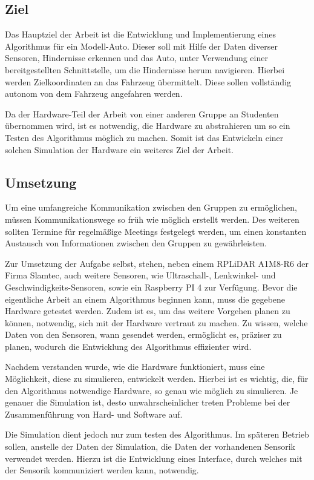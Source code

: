\subsection{Ziel}
Das Hauptziel der Arbeit ist die Entwicklung und Implementierung eines Algorithmus für ein Modell-Auto. Dieser soll mit Hilfe der Daten diverser Sensoren, Hindernisse
erkennen und das Auto, unter Verwendung einer bereitgestellten Schnittstelle, um die Hindernisse herum navigieren.
Hierbei werden Zielkoordinaten an das Fahrzeug übermittelt.
Diese sollen vollständig autonom von dem Fahrzeug angefahren werden.

Da der Hardware-Teil der Arbeit von einer anderen Gruppe an Studenten übernommen wird, ist es notwendig, die Hardware zu abstrahieren um so ein Testen des Algorithmus möglich zu machen. 
Somit ist das Entwickeln einer solchen Simulation der Hardware ein weiteres Ziel der Arbeit.

\subsection{Umsetzung}
Um eine umfangreiche Kommunikation zwischen den Gruppen zu ermöglichen, müssen Kommunikationswege so früh wie möglich erstellt werden.
Des weiteren sollten Termine für regelmäßige Meetings festgelegt werden, um einen konstanten Austausch von Informationen zwischen den Gruppen zu gewährleisten.

Zur Umsetzung der Aufgabe selbst, stehen, neben einem RPLiDAR A1M8-R6 der Firma Slamtec, auch weitere Sensoren, 
wie Ultraschall-, Lenkwinkel- und Geschwindigkeits-Sensoren, sowie ein Raspberry PI 4 zur Verfügung.
Bevor die eigentliche Arbeit an einem Algorithmus beginnen kann, muss die gegebene Hardware getestet werden. 
Zudem ist es, um das weitere Vorgehen planen zu können, notwendig, sich mit der Hardware vertraut zu machen. 
Zu wissen, welche Daten von den Sensoren, wann gesendet werden, ermöglicht es, präziser zu planen, wodurch die Entwicklung des Algorithmus effizienter wird.

Nachdem verstanden wurde, wie die Hardware funktioniert, muss eine Möglichkeit, diese zu simulieren, entwickelt werden.
Hierbei ist es wichtig, die, für den Algorithmus notwendige Hardware, so genau wie möglich zu simulieren. 
Je genauer die Simulation ist, desto unwahrscheinlicher treten Probleme bei der Zusammenführung von Hard- und Software auf.

Die Simulation dient jedoch nur zum testen des Algorithmus.
Im späteren Betrieb sollen, anstelle der Daten der Simulation, die Daten der vorhandenen Sensorik verwendet werden.
Hierzu ist die Entwicklung eines Interface, durch welches mit der Sensorik kommuniziert werden kann, notwendig.

